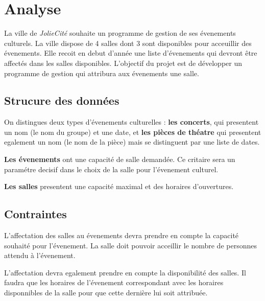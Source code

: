\chapter{Analyse}

La ville de \textit{JolieCité} souhaite un programme de gestion de ses évenements culturels. 
La ville dispose de 4 salles dont 3 sont disponibles pour acceuillir des évenements. 
Elle recoit en debut d'année une liste d'évenements qui devront être affectés dans les salles disponibles. 
L'objectif du projet est de développer un programme de gestion qui attribura aux évenements une salle.

\section{Strucure des données}

On distingues deux types d'évenements culturelles : \textbf{les concerts}, qui presentent un nom (le nom du groupe) et une date, et \textbf{les pièces de théatre} qui presentent egalement un nom (le nom de la pièce) mais se distinguent par une liste de dates.

\textbf{Les évenements} ont une capacité de salle demandée. Ce critaire sera un paramétre decisif dans le choix de la salle pour l'évenement culturel.

\textbf{Les salles} presentent une capacité maximal et des horaires d'ouvertures.

\section{Contraintes}

L'affectation des salles au évenements devra prendre en compte la capacité souhaité pour l'évenement. 
La salle doit pouvoir acceillir le nombre de personnes attendu à l'évenement. 

L'affectation devra egalement prendre en compte la disponibilité des salles. 
Il faudra que les horaires de l'évenement correspondant avec les horaires disponnibles de la salle pour que cette dernière lui soit attribuée. 


